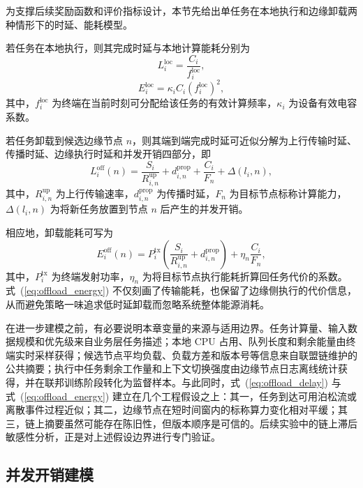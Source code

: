 为支撑后续奖励函数和评价指标设计，本节先给出单任务在本地执行和边缘卸载两种情形下的时延、能耗模型。

若任务在本地执行，则其完成时延与本地计算能耗分别为
\begin{equation}
L_i^{\mathrm{loc}} = \frac{C_i}{f_i^{\mathrm{loc}}},
\label{eq:local_delay}
\end{equation}
\begin{equation}
E_i^{\mathrm{loc}} = \kappa_i C_i \left( f_i^{\mathrm{loc}} \right)^2,
\label{eq:local_energy}
\end{equation}
其中，$f_i^{\mathrm{loc}}$ 为终端在当前时刻可分配给该任务的有效计算频率，$\kappa_i$ 为设备有效电容系数。

若任务卸载到候选边缘节点 $n$，则其端到端完成时延可近似分解为上行传输时延、传播时延、边缘执行时延和并发开销四部分，即
\begin{equation}
L_i^{\mathrm{off}}(n) = \frac{S_i}{R_{i,n}^{\mathrm{up}}} + d_{i,n}^{\mathrm{prop}} + \frac{C_i}{F_n} + \Delta(l_i,n),
\label{eq:offload_delay}
\end{equation}
其中，$R_{i,n}^{\mathrm{up}}$ 为上行传输速率，$d_{i,n}^{\mathrm{prop}}$ 为传播时延，$F_n$ 为目标节点标称计算能力，$\Delta(l_i,n)$ 为将新任务放置到节点 $n$ 后产生的并发开销。

相应地，卸载能耗可写为
\begin{equation}
E_i^{\mathrm{off}}(n) = P_i^{\mathrm{tx}}\left(\frac{S_i}{R_{i,n}^{\mathrm{up}}}+d_{i,n}^{\mathrm{prop}}\right) + \eta_n \frac{C_i}{F_n},
\label{eq:offload_energy}
\end{equation}
其中，$P_i^{\mathrm{tx}}$ 为终端发射功率，$\eta_n$ 为将目标节点执行能耗折算回任务代价的系数。式~(\ref{eq:offload_energy}) 不仅刻画了传输能耗，也保留了边缘侧执行的代价信息，从而避免策略一味追求低时延卸载而忽略系统整体能源消耗。

在进一步建模之前，有必要说明本章变量的来源与适用边界。任务计算量、输入数据规模和优先级来自业务层任务描述；本地 CPU 占用、队列长度和剩余能量由终端实时采样获得；候选节点平均负载、负载方差和版本号等信息来自联盟链维护的公共摘要；执行中任务剩余工作量和上下文切换强度由边缘节点日志离线统计获得，并在联邦训练阶段转化为监督样本。与此同时，式~(\ref{eq:offload_delay}) 与式~(\ref{eq:offload_energy}) 建立在几个工程假设之上：其一，任务到达可用泊松流或离散事件过程近似；其二，边缘节点在短时间窗内的标称算力变化相对平缓；其三，链上摘要虽然可能存在陈旧性，但版本顺序是可信的。后续实验中的链上滞后敏感性分析，正是对上述假设边界进行专门验证。

\subsection{并发开销建模}

